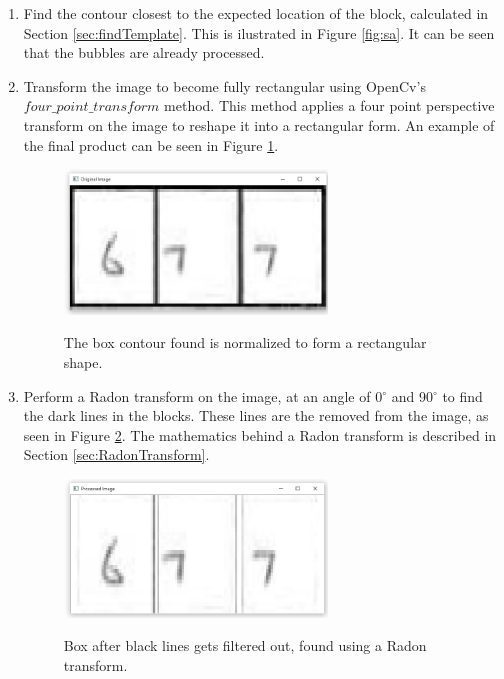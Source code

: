 \begin{enumerate}
\item Find the contour closest to the expected location of the block, calculated in Section \ref{sec:findTemplate}. This is ilustrated in Figure \ref{fig:sa}. It can be seen that the bubbles are already processed.

\item Transform the image to become fully rectangular using OpenCv's $four\_point\_transform$ method. This method applies a four point perspective transform on the image to reshape it into a rectangular form. An example of the final product can be seen in Figure \ref{fig:bp}.

\begin{figure}
  \centering
  \includegraphics[width=7cm]{BeforeProcessing}\\
  \caption{The box contour found is normalized to form a rectangular shape.}
  \label{fig:bp}
\end{figure}

\item Perform a Radon transform on the image, at an angle of 0$^{\circ}$ and 90$^{\circ}$ to find the dark lines in the blocks. These lines are the removed from the image, as seen in Figure \ref{fig:ar}. The mathematics behind a Radon transform is described in Section \ref{sec:RadonTransform}.

\begin{figure}
  \centering
  \includegraphics[width=7cm]{AfterRadon}\\
  \caption{Box after black lines gets filtered out, found using a Radon transform.}
  \label{fig:ar}
\end{figure}


\end{enumerate}

